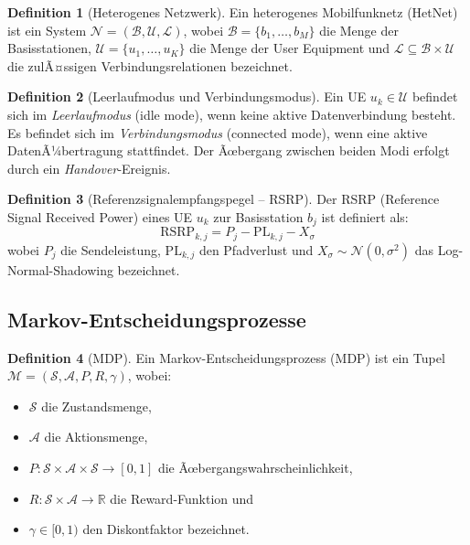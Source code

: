﻿\documentclass[a4paper,12pt]{article}
\theoremstyle{definition}
\newtheorem{definition}{Definition}
\begin{document}
\begin{definition}[Heterogenes Netzwerk]
  Ein heterogenes Mobilfunknetz (HetNet) ist ein System
  $\mathcal{N} = (\mathcal{B}, \mathcal{U}, \mathcal{L})$,
  wobei $\mathcal{B} = \{b_1, \ldots, b_M\}$ die Menge der Basisstationen,
  $\mathcal{U} = \{u_1, \ldots, u_K\}$ die Menge der User Equipment und
  $\mathcal{L} \subseteq \mathcal{B} \times \mathcal{U}$ die zulÃ¤ssigen
  Verbindungsrelationen bezeichnet.
\end{definition}

\begin{definition}[Leerlaufmodus und Verbindungsmodus]
  Ein UE $u_k \in \mathcal{U}$ befindet sich im \emph{Leerlaufmodus} (idle mode),
  wenn keine aktive Datenverbindung besteht. Es befindet sich im \emph{Verbindungsmodus}
  (connected mode), wenn eine aktive DatenÃ¼bertragung stattfindet. Der Ãœbergang zwischen
  beiden Modi erfolgt durch ein \emph{Handover}-Ereignis.
\end{definition}

\begin{definition}[Referenzsignalempfangspegel -- RSRP]
  Der RSRP (Reference Signal Received Power) eines UE $u_k$ zur Basisstation $b_j$ ist
  definiert als:
  \[
    \mathrm{RSRP}_{k,j} = P_j - \mathrm{PL}_{k,j} - X_{\sigma}
  \]
  wobei $P_j$ die Sendeleistung, $\mathrm{PL}_{k,j}$ den Pfadverlust und
  $X_{\sigma} \sim \mathcal{N}(0, \sigma^2)$ das Log-Normal-Shadowing bezeichnet.
\end{definition}

\subsection{Markov-Entscheidungsprozesse}

\begin{definition}[MDP]
  Ein Markov-Entscheidungsprozess (MDP) ist ein Tupel
  $\mathcal{M} = (\mathcal{S}, \mathcal{A}, P, R, \gamma)$, wobei:
  \begin{itemize}
    \item $\mathcal{S}$ die Zustandsmenge,
    \item $\mathcal{A}$ die Aktionsmenge,
    \item $P: \mathcal{S} \times \mathcal{A} \times \mathcal{S} \to [0,1]$ die Ãœbergangswahrscheinlichkeit,
    \item $R: \mathcal{S} \times \mathcal{A} \to \mathbb{R}$ die Reward-Funktion und
    \item $\gamma \in [0,1)$ den Diskontfaktor bezeichnet.
  \end{itemize}
\end{definition}
\end{document}
